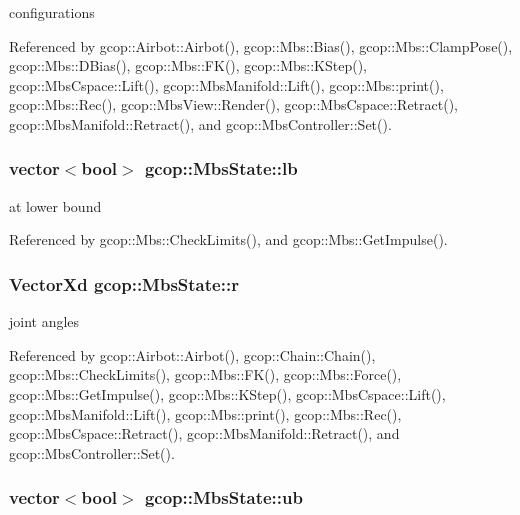 configurations 



\-Referenced by gcop\-::\-Airbot\-::\-Airbot(), gcop\-::\-Mbs\-::\-Bias(), gcop\-::\-Mbs\-::\-Clamp\-Pose(), gcop\-::\-Mbs\-::\-D\-Bias(), gcop\-::\-Mbs\-::\-F\-K(), gcop\-::\-Mbs\-::\-K\-Step(), gcop\-::\-Mbs\-Cspace\-::\-Lift(), gcop\-::\-Mbs\-Manifold\-::\-Lift(), gcop\-::\-Mbs\-::print(), gcop\-::\-Mbs\-::\-Rec(), gcop\-::\-Mbs\-View\-::\-Render(), gcop\-::\-Mbs\-Cspace\-::\-Retract(), gcop\-::\-Mbs\-Manifold\-::\-Retract(), and gcop\-::\-Mbs\-Controller\-::\-Set().

\subsubsection[{lb}]{\setlength{\rightskip}{0pt plus 5cm}vector$<$bool$>$ {\bf gcop\-::\-Mbs\-State\-::lb}}\label{classgcop_1_1MbsState_a1f07b1127294dfca68af68a093d3d73c}


at lower bound 



\-Referenced by gcop\-::\-Mbs\-::\-Check\-Limits(), and gcop\-::\-Mbs\-::\-Get\-Impulse().

\subsubsection[{r}]{\setlength{\rightskip}{0pt plus 5cm}\-Vector\-Xd {\bf gcop\-::\-Mbs\-State\-::r}}\label{classgcop_1_1MbsState_a3a47ff108dc810ec1f289c737444eaf8}


joint angles 



\-Referenced by gcop\-::\-Airbot\-::\-Airbot(), gcop\-::\-Chain\-::\-Chain(), gcop\-::\-Mbs\-::\-Check\-Limits(), gcop\-::\-Mbs\-::\-F\-K(), gcop\-::\-Mbs\-::\-Force(), gcop\-::\-Mbs\-::\-Get\-Impulse(), gcop\-::\-Mbs\-::\-K\-Step(), gcop\-::\-Mbs\-Cspace\-::\-Lift(), gcop\-::\-Mbs\-Manifold\-::\-Lift(), gcop\-::\-Mbs\-::print(), gcop\-::\-Mbs\-::\-Rec(), gcop\-::\-Mbs\-Cspace\-::\-Retract(), gcop\-::\-Mbs\-Manifold\-::\-Retract(), and gcop\-::\-Mbs\-Controller\-::\-Set().

\subsubsection[{ub}]{\setlength{\rightskip}{0pt plus 5cm}vector$<$bool$>$ {\bf gcop\-::\-Mbs\-State\-::ub}}\label{classgcop_1_1MbsState_a93efe0dfe5c0506ffbd78e4f25e9220f}


